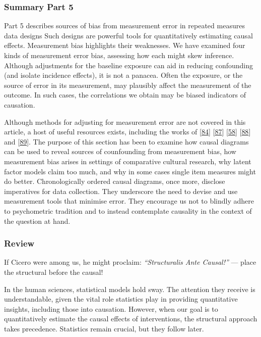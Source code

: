 \documentclass[
  singlecolumn]{article}
\begin{document}
\hypertarget{summary-part-5}{%
\subsubsection{Summary Part 5}\label{summary-part-5}}

Part 5 describes sources of bias from measurement error in repeated
measures data designs Such designs are powerful tools for quantitatively
estimating causal effects. Measurement bias highlights their weaknesses.
We have examined four kinds of measurement error bias, assessing how
each might skew inference. Although adjustments for the baseline
exposure can aid in reducing confounding (and isolate incidence
effects), it is not a panacea. Often the exposure, or the source of
error in its measurement, may plausibly affect the measurement of the
outcome. In such cases, the correlations we obtain may be biased
indicators of causation.

Although methods for adjusting for measurement error are not covered in
this article, a host of useful resources exists, including the works of
{[}\protect\hyperlink{ref-keogh2020}{84}{]}
{[}\protect\hyperlink{ref-buonaccorsi2010}{87}{]}
{[}\protect\hyperlink{ref-shi2021}{58}{]}
{[}\protect\hyperlink{ref-valeri2014}{88}{]} and
{[}\protect\hyperlink{ref-bandalos2018}{89}{]}. The purpose of this
section has been to examine how causal diagrams can be used to reveal
sources of counfounding from measurement bias, how measurement bias
arises in settings of comparative cultural research, why latent factor
models claim too much, and why in some cases single item measures might
do better. Chronologically ordered causal diagrams, once more, disclose
imperatives for data collection. They underscore the need to devise and
use measurement tools that minimise error. They encourage us not to
blindly adhere to psychometric tradition and to instead contemplate
causality in the context of the question at hand.

\hypertarget{review}{%
\subsubsection{Review}\label{review}}

If Cicero were among us, he might proclaim: \emph{``Structuralis Ante
Causal!''} --- place the structural before the causal!

In the human sciences, statistical models hold sway. The attention they
receive is understandable, given the vital role statistics play in
providing quantitative insights, including those into causation.
However, when our goal is to quantitatively estimate the causal effects
of interventions, the structural approach takes precedence. Statistics
remain crucial, but they follow later.
\end{document}
